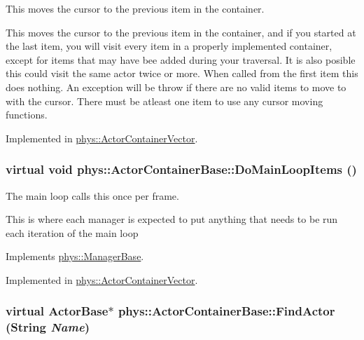 This moves the cursor to the previous item in the container. 

This moves the cursor to the previous item in the container, and if you started at the last item, you will visit every item in a properly implemented container, except for items that may have bee added during your traversal. It is also posible this could visit the same actor twice or more. When called from the first item this does nothing. An exception will be throw if there are no valid items to move to with the cursor. There must be atleast one item to use any cursor moving functions. 

Implemented in \hyperlink{classphys_1_1ActorContainerVector_ac483bcdf348f55dc8b04a8805a002413}{phys::ActorContainerVector}.

\hypertarget{classphys_1_1ActorContainerBase_a67fbde6a61602253f66fecd0416bdc2f}{
\subsubsection[{DoMainLoopItems}]{\setlength{\rightskip}{0pt plus 5cm}virtual void phys::ActorContainerBase::DoMainLoopItems ()}}
\label{d1/d00/classphys_1_1ActorContainerBase_a67fbde6a61602253f66fecd0416bdc2f}


The main loop calls this once per frame. 

This is where each manager is expected to put anything that needs to be run each iteration of the main loop 

Implements \hyperlink{classphys_1_1ManagerBase_aa9e13a3f7c398b708f0f242610b5abf7}{phys::ManagerBase}.



Implemented in \hyperlink{classphys_1_1ActorContainerVector_a883e59ac1674421bac143088a6cf07c8}{phys::ActorContainerVector}.

\hypertarget{classphys_1_1ActorContainerBase_a91223cbaebb8e5f11a4f971d7e5b64b6}{
\subsubsection[{FindActor}]{\setlength{\rightskip}{0pt plus 5cm}virtual {\bf ActorBase}$\ast$ phys::ActorContainerBase::FindActor ({\bf String} {\em Name})}}
\label{d1/d00/classphys_1_1ActorContainerBase_a91223cbaebb8e5f11a4f971d7e5b64b6}


